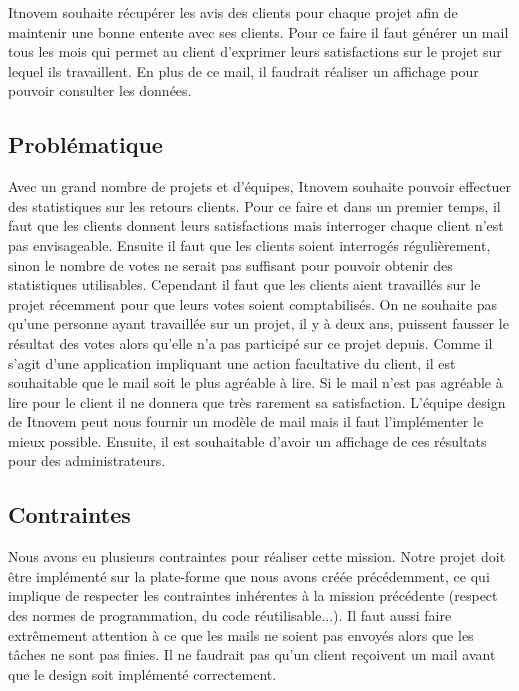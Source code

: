 \documentclass[12pt, twoside, openright]{report}
\begin{document}
Itnovem souhaite récupérer les avis des clients pour chaque projet afin de maintenir une bonne entente avec ses clients. Pour ce faire il faut générer un mail tous les mois qui permet au client d'exprimer leurs satisfactions sur le projet sur lequel ils travaillent. En plus de ce mail, il faudrait réaliser un affichage pour pouvoir consulter les données. 

\subsection{Problématique}

Avec un grand nombre de projets et d'équipes, Itnovem souhaite pouvoir effectuer des statistiques sur les retours clients. Pour ce faire et dans un premier temps, il faut que les clients donnent leurs satisfactions mais interroger chaque client n'est pas envisageable. Ensuite il faut que les clients soient interrogés régulièrement, sinon le nombre de votes ne serait pas suffisant pour pouvoir obtenir des statistiques utilisables. Cependant il faut que les clients aient travaillés sur le projet récemment pour que leurs votes soient comptabilisés. On ne souhaite pas qu'une personne ayant travaillée sur un projet, il y à deux ans, puissent fausser le résultat des votes alors qu'elle n'a pas participé sur ce projet depuis. Comme il s'agit d'une application impliquant une action facultative du client, il est souhaitable que le mail soit le plus agréable à lire. Si le mail n'est pas agréable à lire pour le client il ne donnera que très rarement sa satisfaction. L'équipe design de Itnovem peut nous fournir un modèle de mail mais il faut l'implémenter le mieux possible. Ensuite, il est souhaitable d'avoir un affichage de ces résultats pour des administrateurs.

\subsection{Contraintes}

Nous avons eu plusieurs contraintes pour réaliser cette mission. Notre projet doit être implémenté sur la plate-forme que nous avons créée précédemment, ce qui implique de respecter les contraintes inhérentes à la mission précédente (respect des normes de programmation, du code réutilisable...). Il faut aussi faire extrêmement attention à ce que les mails ne soient pas envoyés alors que les tâches ne sont pas finies. Il ne faudrait pas qu'un client reçoivent un mail avant que le design soit implémenté correctement. 
\end{document}
